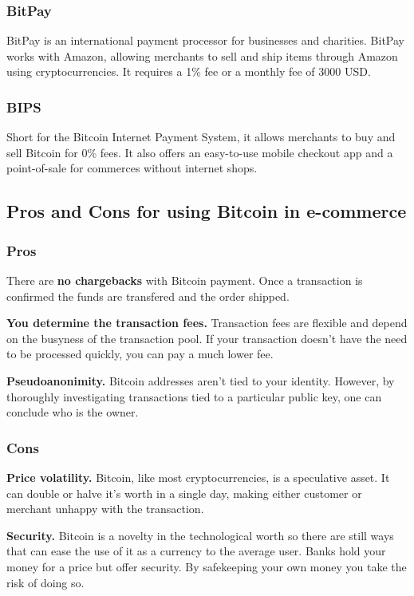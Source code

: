\documentclass{ferseminar}
\begin{document}
\subsubsection{BitPay}
BitPay is an international payment processor for businesses and charities. BitPay works with Amazon, allowing merchants to sell and ship items through Amazon using cryptocurrencies. It requires a 1\% fee or a monthly fee of 3000 USD.
\subsubsection{BIPS}
Short for the Bitcoin Internet Payment System, it allows merchants to buy and sell Bitcoin for 0\% fees. It also offers an easy-to-use mobile checkout app and a point-of-sale for commerces without internet shops.
\subsection{Pros and Cons for using Bitcoin in e-commerce}
\subsubsection{Pros}
There are \textbf{no chargebacks} with Bitcoin payment. Once a transaction is confirmed the funds are transfered and the order shipped.

\textbf{You determine the transaction fees.} Transaction fees are flexible and depend on the busyness of the transaction pool. If your transaction doesn't have the need to be processed quickly, you can pay a much lower fee.

\textbf{Pseudoanonimity.} Bitcoin addresses aren't tied to your identity. However, by thoroughly investigating transactions tied to a particular public key, one can conclude who is the owner.

\subsubsection{Cons}
\textbf{Price volatility.} Bitcoin, like most cryptocurrencies, is a speculative asset. It can double or halve it's worth in a single day, making either customer or merchant unhappy with the transaction.

\textbf{Security.} Bitcoin is a novelty in the technological worth so there are still ways that can ease the use of it as a currency to the average user. Banks hold your money for a price but offer security. By safekeeping your own money you take the risk of doing so. 
\end{document}
